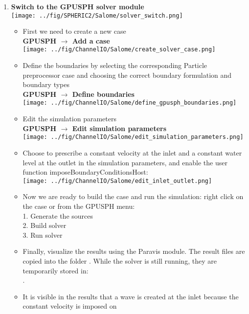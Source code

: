 \documentclass{../GPUSPHtemplate}
\begin{document}
\begin{enumerate}
\item \textbf{Switch to the GPUSPH solver module}  \smallskip\\
  \texttt{[image: ../fig/SPHERIC2/Salome/solver\_switch.png]}
  \begin{itemize}
  \item First we need to create a new case\\
    \textbf{GPUSPH $\to$ Add a case}\smallskip\\
    \texttt{[image: ../fig/ChannelIO/Salome/create\_solver\_case.png]}
  \item Define the boundaries by selecting the corresponding Particle preprocessor case and choosing the correct boundary formulation
    and boundary types\\
    \textbf{GPUSPH $\to$ Define boundaries}\smallskip\\
    \texttt{[image: ../fig/ChannelIO/Salome/define\_gpusph\_boundaries.png]}
  \item Edit the simulation parameters\\
    \textbf{GPUSPH $\to$ Edit simulation parameters}\smallskip\\
    \texttt{[image: ../fig/ChannelIO/Salome/edit\_simulation\_parameters.png]}\medskip
  \item Choose to prescribe a constant velocity at the inlet and a constant water level at the outlet in the simulation parameters,
    and enable the user function imposeBoundaryConditionsHost:\\
    \texttt{[image: ../fig/ChannelIO/Salome/edit\_inlet\_outlet.png]}\medskip
  \item Now we are ready to build the case and run the simulation: right click on the case or from the GPUSPH menu:\\
    1. Generate the sources\\
    2. Build solver\\
    3. Run solver
  \item Finally, visualize the results using the Paravis module. The result files are copied into the folder
    . While the solver is still running, they are temporarily stored in:\\
    .
  \item It is visible in the results that a wave is created at the inlet because the constant velocity is imposed on

\end{itemize}
\end{enumerate}
\end{document}
